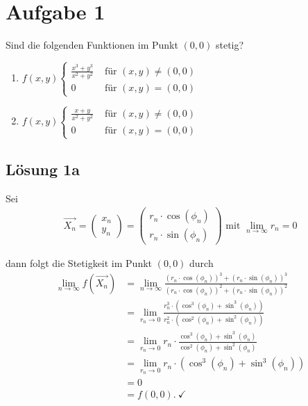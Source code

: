 \documentclass[main.tex]{subfiles}
\begin{document}
\section{Aufgabe 1}
Sind die folgenden Funktionen im Punkt $(0,0)$ stetig?
\begin{enumerate}
    \item $f(x,y) \begin{cases}
        \frac{x^3+y^3}{x^2+y^2} & \text{ für } (x,y) \neq (0,0)\\
        0                       & \text{ für } (x,y) = (0,0)
    \end{cases}$
    \item $f(x,y) \begin{cases}
        \frac{x+y}{x^2+y^2} & \text{ für } (x,y) \neq (0,0)\\
        0                   & \text{ für } (x,y) = (0,0)
    \end{cases}$
\end{enumerate}

\subsection{Lösung 1a}
Sei
\begin{align*}
    \vec{X_n} = \begin{pmatrix}x_n \\ y_n \end{pmatrix}
    = \begin{pmatrix}
        r_n\cdot \cos (\phi_n) \\
        r_n\cdot \sin (\phi_n)
    \end{pmatrix} \text{ mit } \lim_{n\rightarrow \infty} r_n = 0
\end{align*}

dann folgt die Stetigkeit im Punkt $(0,0)$ durch
\begin{align*}
    \lim_{n\rightarrow \infty} f(\vec{X_n})
        &= \lim_{n\rightarrow \infty} \frac{(r_n\cdot \cos (\phi_n))^3+(r_n\cdot \sin (\phi_n))^3}{(r_n\cdot \cos (\phi_n))^2+(r_n\cdot \sin (\phi_n))^2} \\
        &= \lim_{r_n\rightarrow 0} \frac{
                r_n^3 \cdot \left( \cos^3 (\phi_n) + \sin^3 (\phi_n) \right)
            }{
                r_n^2 \cdot \left( \cos^2 (\phi_n) + \sin^2 (\phi_n) \right)
            }\\
        &= \lim_{r_n\rightarrow 0} r_n \cdot \frac{
                \cos^3 (\phi_n) + \sin^3 (\phi_n)
            }{
                \cos^2 (\phi_n) + \sin^2 (\phi_n)
            }\\
        &= \lim_{r_n\rightarrow 0} r_n \cdot \left( \cos^3 (\phi_n) + \sin^3 (\phi_n) \right) \\
        &= 0 \\
        &= f(0,0). \ \checkmark
\end{align*}
\end{document}
